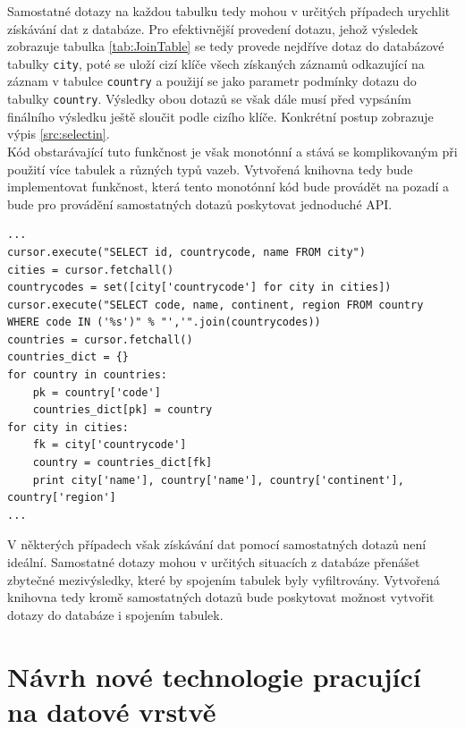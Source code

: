 \documentclass[ing,male,java,dept456]{diploma}						%
\begin{document}
Samostatné dotazy na každou tabulku tedy mohou v určitých případech urychlit získávání dat z databáze. Pro efektivnější provedení dotazu, jehož výsledek zobrazuje tabulka \ref{tab:JoinTable} se tedy provede nejdříve dotaz do databázové tabulky \lstinline[style=inlinepython]|city|, poté se uloží cizí klíče všech získaných záznamů odkazující na záznam v tabulce \lstinline[style=inlinepython]|country| a použijí se jako parametr podmínky dotazu do tabulky \lstinline[style=inlinepython]|country|. Výsledky obou dotazů se však dále musí před vypsáním finálního výsledku ještě sloučit podle cizího klíče. Konkrétní postup zobrazuje výpis \ref{src:selectin}. \\
Kód obstarávající tuto funkčnost je však monotónní a stává se komplikovaným při použití více tabulek a různých typů vazeb. Vytvořená knihovna tedy bude implementovat funkčnost, která tento monotónní kód bude provádět na pozadí a bude pro provádění samostatných dotazů poskytovat jednoduché API. \\

\clearpage

\begin{lstlisting}[style=custompython, label=src:selectin, caption={Získávání dat pomocí samostatných dotazů}]
...
cursor.execute("SELECT id, countrycode, name FROM city")
cities = cursor.fetchall()
countrycodes = set([city['countrycode'] for city in cities])
cursor.execute("SELECT code, name, continent, region FROM country WHERE code IN ('%s')" % "','".join(countrycodes))
countries = cursor.fetchall()
countries_dict = {}
for country in countries:
    pk = country['code']
    countries_dict[pk] = country
for city in cities:
    fk = city['countrycode']
    country = countries_dict[fk]
    print city['name'], country['name'], country['continent'], country['region']
...
\end{lstlisting}

V některých případech však získávání dat pomocí samostatných dotazů není ideální. Samostatné dotazy mohou v určitých situacích z databáze přenášet zbytečné mezivýsledky, které by spojením tabulek byly vyfiltrovány. Vytvořená knihovna tedy kromě samostatných dotazů bude poskytovat možnost vytvořit dotazy do databáze i spojením tabulek.

\section{Návrh nové technologie pracující na datové vrstvě}
\label{sec:Impl}
\end{document}
